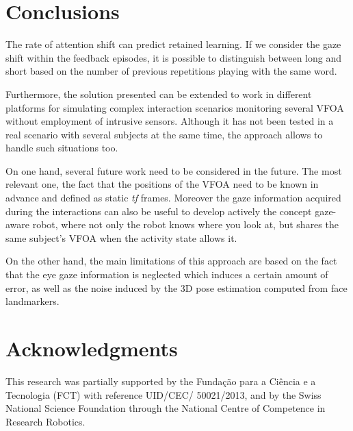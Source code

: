 \documentclass{sig-alternate}
\begin{document}
\section{Conclusions}
The rate of attention shift can predict retained learning. If we consider the gaze shift within the feedback episodes, it is possible to distinguish between long and short based on the number of previous repetitions playing with the same word.

Furthermore, the solution presented can be extended to work in different platforms for simulating complex interaction scenarios monitoring several VFOA without employment of intrusive sensors. Although it has not been tested in a real scenario with several subjects at the same time, the approach allows to handle such situations too.

On one hand, several future work need to be considered in the future. The most relevant one, the fact that the positions of the VFOA need to be known in advance and defined as static \textit{tf} frames. Moreover the gaze information acquired during the interactions can also be useful to develop actively the concept gaze-aware robot, where not only the robot knows where you look at, but shares the same subject's VFOA when the activity state allows it. 

On the other hand, the main limitations of this approach are based on the fact that the eye gaze information is neglected which induces a certain amount of error, as well as the noise induced by the 3D pose estimation computed from face landmarkers.

\section*{Acknowledgments}
This research was partially supported by the Funda\c{c}\~{a}o para a Ci\^{e}ncia
e a Tecnologia (FCT) with reference UID/CEC/ 50021/2013, and by the Swiss
National Science Foundation through the National Centre of Competence in
Research Robotics.



\end{document}
